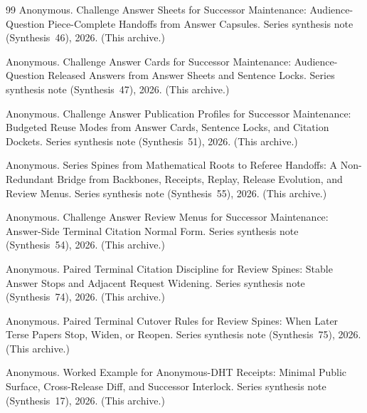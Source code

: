 \documentclass[11pt]{article}
\begin{document}
\begin{thebibliography}{99}
Anonymous.
\newblock Challenge Answer Sheets for Successor Maintenance: Audience-Question Piece-Complete Handoffs from Answer Capsules.
\newblock Series synthesis note (Synthesis~46), 2026. (This archive.)

Anonymous.
\newblock Challenge Answer Cards for Successor Maintenance: Audience-Question Released Answers from Answer Sheets and Sentence Locks.
\newblock Series synthesis note (Synthesis~47), 2026. (This archive.)

Anonymous.
\newblock Challenge Answer Publication Profiles for Successor Maintenance: Budgeted Reuse Modes from Answer Cards, Sentence Locks, and Citation Dockets.
\newblock Series synthesis note (Synthesis~51), 2026. (This archive.)


Anonymous.
\newblock Series Spines from Mathematical Roots to Referee Handoffs: A Non-Redundant Bridge from Backbones, Receipts, Replay, Release Evolution, and Review Menus.
\newblock Series synthesis note (Synthesis~55), 2026. (This archive.)

Anonymous.
\newblock Challenge Answer Review Menus for Successor Maintenance: Answer-Side Terminal Citation Normal Form.
\newblock Series synthesis note (Synthesis~54), 2026. (This archive.)

Anonymous.
\newblock Paired Terminal Citation Discipline for Review Spines: Stable Answer Stops and Adjacent Request Widening.
\newblock Series synthesis note (Synthesis~74), 2026. (This archive.)

Anonymous.
\newblock Paired Terminal Cutover Rules for Review Spines: When Later Terse Papers Stop, Widen, or Reopen.
\newblock Series synthesis note (Synthesis~75), 2026. (This archive.)

Anonymous.
\newblock Worked Example for Anonymous-DHT Receipts: Minimal Public Surface, Cross-Release Diff, and Successor Interlock.
\newblock Series synthesis note (Synthesis~17), 2026. (This archive.)

\end{thebibliography}
\end{document}
